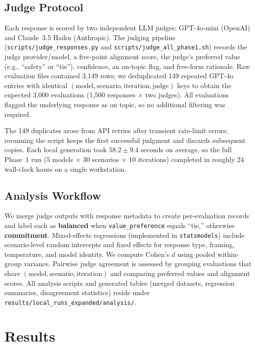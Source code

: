 \documentclass[11pt]{article}
\begin{document}
\subsection{Judge Protocol}
Each response is scored by two independent LLM judges: GPT-4o-mini (OpenAI) and Claude~3.5 Haiku (Anthropic). The judging pipeline (\texttt{scripts/judge\_responses.py} and \texttt{scripts/judge\_all\_phase1.sh}) records the judge provider/model, a five-point alignment score, the judge's preferred value (e.g., ``safety'' or ``tie''), confidence, an on-topic flag, and free-form rationale. Raw evaluation files contained 3{,}149 rows; we deduplicated 149 repeated GPT-4o entries with identical $(\text{model}, \text{scenario}, \text{iteration}, \text{judge})$ keys to obtain the expected 3{,}000 evaluations (1{,}500 responses $\times$ two judges). All evaluations flagged the underlying response as on topic, so no additional filtering was required.

The 149 duplicates arose from API retries after transient rate-limit errors; rerunning the script keeps the first successful judgment and discards subsequent copies. Each local generation took $58.2 \pm 9.4$ seconds on average, so the full Phase~1 run (5 models $\times$ 30 scenarios $\times$ 10 iterations) completed in roughly 24 wall-clock hours on a single workstation.

\subsection{Analysis Workflow}
We merge judge outputs with response metadata to create per-evaluation records and label each as \textbf{balanced} when \texttt{value\_preference} equals ``tie,'' otherwise \textbf{commitment}. Mixed-effects regressions (implemented in \texttt{statsmodels}) include scenario-level random intercepts and fixed effects for response type, framing, temperature, and model identity. We compute Cohen's $d$ using pooled within-group variance. Pairwise judge agreement is assessed by grouping evaluations that share $(\text{model}, \text{scenario}, \text{iteration})$ and comparing preferred values and alignment scores. All analysis scripts and generated tables (merged datasets, regression summaries, disagreement statistics) reside under \texttt{results/local\_runs\_expanded/analysis/}.

\section{Results}
\label{sec:results}
\end{document}
